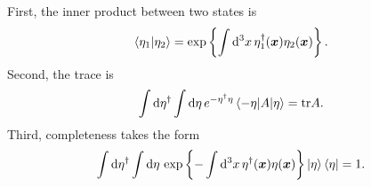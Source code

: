First, the inner product between two states is
\begin{equation}
	\braket{\eta_1 | \eta_2} = \exp \left\{ \int \mathop{}\!\mathrm{d}^3 x \, \eta_1^\dagger({\bm{x}}) \eta_2({\bm{x}}) \right\} .
\label{eq:tft:grassmann_inner_product}
\end{equation}
Second, the trace is
\begin{equation}
	\int \mathop{}\!\mathrm{d} \eta^\dagger \int \mathop{}\!\mathrm{d} \eta \, e^{-\eta^\dagger \eta} \braket{-\eta | A | \eta} = \text{tr} A .
\label{eq:tft:trace_grassmann}
\end{equation}
Third, completeness takes the form
\begin{equation}
	\int \mathop{}\!\mathrm{d} \eta^\dagger \int \mathop{}\!\mathrm{d} \eta \, \exp \left\{-\int \mathop{}\!\mathrm{d}^3 x \, \eta^\dagger({\bm{x}}) \eta({\bm{x}}) \right\} \ket{\eta} \bra{\eta} = 1 .
\label{eq:tft:completeness_grassmann}
\end{equation}

